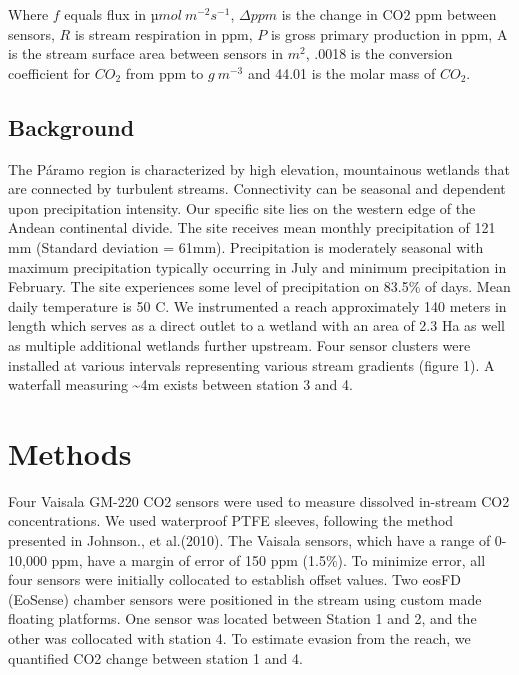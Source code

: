 \documentclass[draft,linenumbers]{agujournal2018}
\begin{document}
Where \(f\) equals flux in \(µmol\:m^{-2}s^{-1}\), \(\Delta ppm\) is the
change in CO2 ppm between sensors, \(R\) is stream respiration in ppm,
\(P\) is gross primary production in ppm, A is the stream surface area
between sensors in \(m^2\), .0018 is the conversion coefficient for
\(CO_2\) from ppm to \(g\:m^{-3}\) and 44.01 is the molar mass of
\(CO_2\).

\subsection{Background}

The Páramo region is characterized by high elevation, mountainous
wetlands that are connected by turbulent streams. Connectivity can be
seasonal and dependent upon precipitation intensity. Our specific site
lies on the western edge of the Andean continental divide. The site
receives mean monthly precipitation of 121 mm (Standard deviation =
61mm). Precipitation is moderately seasonal with maximum precipitation
typically occurring in July and minimum precipitation in February. The
site experiences some level of precipitation on 83.5\% of days. Mean
daily temperature is 50 C. We instrumented a reach approximately 140
meters in length which serves as a direct outlet to a wetland with an
area of 2.3 Ha as well as multiple additional wetlands further upstream.
Four sensor clusters were installed at various intervals representing
various stream gradients (figure 1). A waterfall measuring
\textasciitilde{}4m exists between station 3 and 4.

\section{Methods}

Four Vaisala GM-220 CO2 sensors were used to measure dissolved in-stream
CO2 concentrations. We used waterproof PTFE sleeves, following the
method presented in Johnson., et al.(2010). The Vaisala sensors, which
have a range of 0-10,000 ppm, have a margin of error of 150 ppm (1.5\%).
To minimize error, all four sensors were initially collocated to
establish offset values. Two eosFD (EoSense) chamber sensors were
positioned in the stream using custom made floating platforms. One
sensor was located between Station 1 and 2, and the other was collocated
with station 4. To estimate evasion from the reach, we quantified CO2
change between station 1 and 4.
\end{document}
